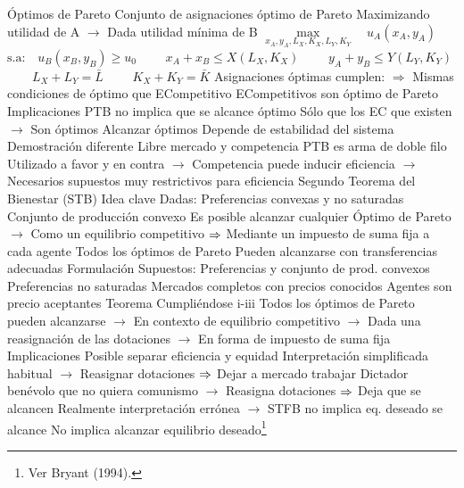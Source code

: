 \documentclass{nuevotema}
\begin{document}
\begin{esquemal}
			\3 Óptimos de Pareto
				\4 Conjunto de asignaciones óptimo de Pareto
				\4[] Maximizando utilidad de A
				\4[] $\to$ Dada utilidad mínima de B
				\4[] $\underset{x_A,y_A, L_X, K_X, L_Y, K_Y}{\max} \quad u_A(x_A, y_A)$
				\4[] $\text{s.a:} \quad u_B(x_B, y_B) \geq u_0$
				\4[] $\quad \quad x_A + x_B \leq X(L_X, K_X)$
				\4[] $\quad \quad y_A + y_B \leq Y(L_Y, K_Y)$
				\4[] $\quad \quad L_X + L_Y = \bar{L}$
				\4[] $\quad \quad K_X + K_Y = \bar{K}$
				\4 Asignaciones óptimas cumplen:
				\4[] $\Rightarrow$ 
				\4[$\then$] Mismas condiciones de óptimo que ECompetitivo
				\4[$\then$] ECompetitivos son óptimo de Pareto
			\3 Implicaciones
				\4 PTB no implica que se alcance óptimo
				\4[] Sólo que los EC que existen
				\4[] $\to$ Son óptimos
				\4 Alcanzar óptimos
				\4[] Depende de estabilidad del sistema
				\4[] Demostración diferente
				\4 Libre mercado y competencia
				\4[] PTB es arma de doble filo
				\4[] Utilizado a favor y en contra
				\4[] $\to$ Competencia puede inducir eficiencia
				\4[] $\to$ Necesarios supuestos muy restrictivos para eficiencia
		\2 Segundo Teorema del Bienestar (STB)
			\3 Idea clave
				\4 Dadas:
				\4[] Preferencias convexas y no saturadas
				\4[] Conjunto de producción convexo
				\4 Es posible alcanzar cualquier Óptimo de Pareto
				\4[] $\to$ Como un equilibrio competitivo
				\4[] $\then$ Mediante un impuesto de suma fija a cada agente
				\4 Todos los óptimos de Pareto
				\4[] Pueden alcanzarse con transferencias adecuadas
				\4[] 
			\3 Formulación
				\4 Supuestos:
				\4[i] Preferencias y conjunto de prod. convexos
				\4[ii] Preferencias no saturadas
				\4[iii] Mercados completos con precios conocidos
				\4[iv] Agentes son precio aceptantes
				\4 Teorema
				\4[] Cumpliéndose i-iii
				\4[] Todos los óptimos de Pareto pueden alcanzarse
				\4[] $\to$ En contexto de equilibrio competitivo
				\4[] $\to$ Dada una reasignación de las dotaciones
				\4[] $\to$ En forma de impuesto de suma fija
			\3 Implicaciones
				\4 Posible separar eficiencia y equidad
				\4[] Interpretación simplificada habitual
				\4[] $\to$ Reasignar dotaciones
				\4[] $\then$ Dejar a mercado trabajar
				\4[] Dictador benévolo que no quiera comunismo
				\4[] $\to$ Reasigna dotaciones
				\4[] $\then$ Deja que se alcancen
				\4[] Realmente interpretación errónea
				\4[] $\to$ STFB no implica eq. deseado se alcance
				\4 No implica alcanzar equilibrio deseado\footnote{Ver Bryant (1994).}

\end{esquemal}
\end{document}
